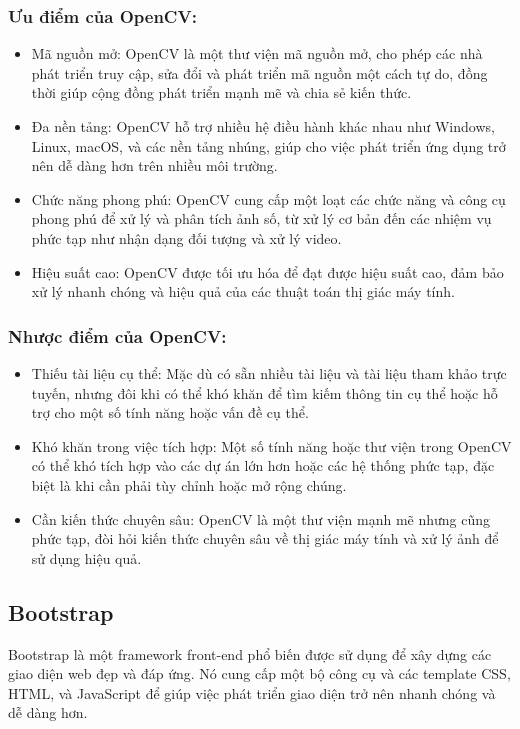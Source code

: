 \documentclass[a4paper]{article}
\begin{document}
\subsubsection{Ưu điểm của OpenCV:}
\begin{itemize}
	\item Mã nguồn mở: OpenCV là một thư viện mã nguồn mở, cho phép các nhà phát triển truy cập, sửa đổi và phát triển mã nguồn một cách tự do, đồng thời giúp cộng đồng phát triển mạnh mẽ và chia sẻ kiến thức.
    \item Đa nền tảng: OpenCV hỗ trợ nhiều hệ điều hành khác nhau như Windows, Linux, macOS, và các nền tảng nhúng, giúp cho việc phát triển ứng dụng trở nên dễ dàng hơn trên nhiều môi trường.
    \item Chức năng phong phú: OpenCV cung cấp một loạt các chức năng và công cụ phong phú để xử lý và phân tích ảnh số, từ xử lý cơ bản đến các nhiệm vụ phức tạp như nhận dạng đối tượng và xử lý video.
    \item Hiệu suất cao: OpenCV được tối ưu hóa để đạt được hiệu suất cao, đảm bảo xử lý nhanh chóng và hiệu quả của các thuật toán thị giác máy tính.
\end{itemize}
\subsubsection{Nhược điểm của OpenCV:}
\begin{itemize}
	\item Thiếu tài liệu cụ thể: Mặc dù có sẵn nhiều tài liệu và tài liệu tham khảo trực tuyến, nhưng đôi khi có thể khó khăn để tìm kiếm thông tin cụ thể hoặc hỗ trợ cho một số tính năng hoặc vấn đề cụ thể.
    \item Khó khăn trong việc tích hợp: Một số tính năng hoặc thư viện trong OpenCV có thể khó tích hợp vào các dự án lớn hơn hoặc các hệ thống phức tạp, đặc biệt là khi cần phải tùy chỉnh hoặc mở rộng chúng.
    \item Cần kiến thức chuyên sâu: OpenCV là một thư viện mạnh mẽ nhưng cũng phức tạp, đòi hỏi kiến thức chuyên sâu về thị giác máy tính và xử lý ảnh để sử dụng hiệu quả.
\end{itemize}

\subsection{Bootstrap}
Bootstrap là một framework front-end phổ biến được sử dụng để xây dựng các giao diện web đẹp và đáp ứng. Nó cung cấp một bộ công cụ và các template CSS, HTML, và JavaScript để giúp việc phát triển giao diện trở nên nhanh chóng và dễ dàng hơn.
\end{document}
